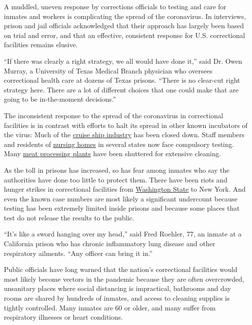 A muddled, uneven response by corrections officials to testing and care
for inmates and workers is complicating the spread of the coronavirus.
In interviews, prison and jail officials acknowledged that their
approach has largely been based on trial and error, and that an
effective, consistent response for U.S. correctional facilities remains
elusive.

``If there was clearly a right strategy, we all would have done it,''
said Dr. Owen Murray, a University of Texas Medical Branch physician who
oversees correctional health care at dozens of Texas prisons. ``There is
no clear-cut right strategy here. There are a lot of different choices
that one could make that are going to be in-the-moment decisions.''

The inconsistent response to the spread of the coronavirus in
correctional facilities is in contrast with efforts to halt its spread
in other known incubators of the virus: Much of the
\href{https://www.federalregister.gov/documents/2020/04/15/2020-07930/no-sail-order-and-suspension-of-further-embarkation-notice-of-modification-and-extension-and-other}{cruise
ship industry} has been closed down. Staff members and residents of
\href{https://apnews.com/1a169a537c6fb7f9ab824c49a6757b0c}{nursing
homes} in several states now face compulsory testing. Many
\href{https://www.foodprocessing.com/articles/2020/how-coronavirus-slammed-meat-and-poultry/}{meat
processing plants} have been shuttered for extensive cleaning.

As the toll in prisons has increased, so has fear among inmates who say
the authorities have done too little to protect them. There have been
riots and hunger strikes in correctional facilities from
\href{https://www.heraldnet.com/news/major-disturbance-at-monroe-prison-follows-covid-19-outbreak/}{Washington
State} to New York. And even the known case numbers are most likely a
significant undercount because testing has been extremely limited inside
prisons and because some places that test do not release the results to
the public.

``It's like a sword hanging over my head,'' said Fred Roehler, 77, an
inmate at a California prison who has chronic inflammatory lung disease
and other respiratory ailments. ``Any officer can bring it in.''

Public officials have long warned that the nation's correctional
facilities would most likely become vectors in the pandemic because they
are often overcrowded, unsanitary places where social distancing is
impractical, bathrooms and day rooms are shared by hundreds of inmates,
and access to cleaning supplies is tightly controlled. Many inmates are
60 or older, and many suffer from respiratory illnesses or heart
conditions.

